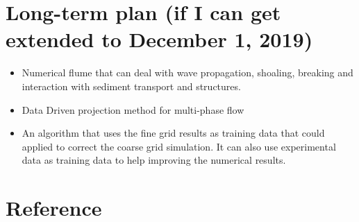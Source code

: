 \documentclass[11pt]{article}
\begin{document}
\section{Long-term plan (if I can get extended to December 1, 2019)}
\label{sec:org5457e2b}

\begin{itemize}
\item Numerical flume that can deal with wave propagation, shoaling, breaking and
interaction with sediment transport and structures.
\item Data Driven projection method for multi-phase flow
\item An algorithm that uses the fine grid results as training data that could
applied to correct the coarse grid simulation. It can also use experimental
data as training data to help improving the numerical results.
\end{itemize}

\section{Reference}
\label{sec:orgb93c28b}
\end{document}
